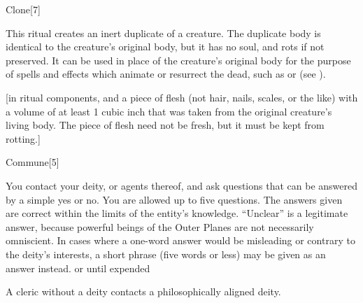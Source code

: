 \begin{spellsection}{Clone}[7]
    \begin{spellheader}
    \end{spellheader}
    \begin{spellcontent}
        \begin{spelltargetinginfo}
        \end{spelltargetinginfo}
        \begin{spelleffects}
            \spelleffect This ritual creates an inert duplicate of a creature. The duplicate body is identical to the creature's original body, but it has no soul, and rots if not preserved. It can be used in place of the creature's original body for the purpose of spells and effects which animate or resurrect the dead, such as  or  (see ).
        \end{spelleffects}
    \end{spellcontent}
    \begin{spellfooter}
        [in ritual components, and a piece of flesh (not hair, nails, scales, or the like) with a volume of at least 1 cubic inch that was taken from the original creature's living body. The piece of flesh need not be fresh, but it must be kept from rotting.]
    \end{spellfooter}
\end{spellsection}

\begin{spellsection}{Commune}[5]
    \begin{spellheader}
    \end{spellheader}
    \begin{spellcontent}
        \begin{spelltargetinginfo}
        \end{spelltargetinginfo}
        \begin{spelleffects}
            \spelleffect You contact your deity, or agents thereof, and ask questions that can be answered by a simple yes or no. You are allowed up to five questions. The answers given are correct within the limits of the entity's knowledge. ``Unclear'' is a legitimate answer, because powerful beings of the Outer Planes are not necessarily omniscient. In cases where a one-word answer would be misleading or contrary to the deity's interests, a short phrase (five words or less) may be given as an answer instead.
            \spelldur \durmed or until expended
        \end{spelleffects}
    \end{spellcontent}
    \begin{spellfooter}
        \spellnotes A cleric without a deity contacts a philosophically aligned deity.
    \end{spellfooter}
\end{spellsection}

